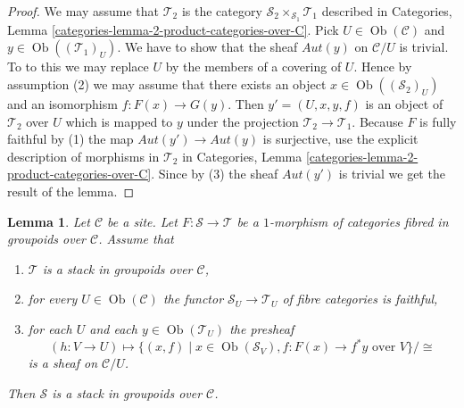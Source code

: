 \documentclass{stacks-project}
\theoremstyle{plain}
\newtheorem{lemma}[subsection]{Lemma}
\theoremstyle{definition}
\theoremstyle{remark}
\numberwithin{equation}{subsection}
\def\Ob{\mathop{\mathrm{Ob}}\nolimits}
\begin{document}
\begin{proof}
We may assume that $\mathcal{T}_2$ is the category
$\mathcal{S}_2 \times_{\mathcal{S}_1} \mathcal{T}_1$
described in
Categories, Lemma \ref{categories-lemma-2-product-categories-over-C}.
Pick $U \in \Ob(\mathcal{C})$ and
$y \in \Ob((\mathcal{T}_1)_U)$.
We have to show that the sheaf $\mathit{Aut}(y)$ on $\mathcal{C}/U$
is trivial. To to this we may replace $U$ by the members of
a covering of $U$. Hence by assumption (2) we may assume that
there exists an object $x \in \Ob((\mathcal{S}_2)_U)$
and an isomorphism $f : F(x) \to G(y)$.
Then $y' = (U, x, y, f)$ is an object of $\mathcal{T}_2$ over $U$
which is mapped to $y$ under the projection $\mathcal{T}_2 \to \mathcal{T}_1$.
Because $F$ is fully faithful by (1) the map
$\mathit{Aut}(y') \to \mathit{Aut}(y)$ is surjective, use the explicit
description of morphisms in $\mathcal{T}_2$ in
Categories, Lemma \ref{categories-lemma-2-product-categories-over-C}.
Since by (3) the sheaf $\mathit{Aut}(y')$ is trivial
we get the result of the lemma.
\end{proof}

\begin{lemma}
\label{lemma-relative-sheaf-over-stack-is-stack}
Let $\mathcal{C}$ be a site. Let $F : \mathcal{S} \to \mathcal{T}$
be a $1$-morphism of categories fibred in groupoids over $\mathcal{C}$.
Assume that
\begin{enumerate}
\item $\mathcal{T}$ is a stack in groupoids over $\mathcal{C}$,
\item for every $U \in \Ob(\mathcal{C})$ the functor
$\mathcal{S}_U \to \mathcal{T}_U$ of fibre categories is faithful,
\item for each $U$ and each $y \in \Ob(\mathcal{T}_U)$ the presheaf
$$
(h : V \to U)
\longmapsto
\{(x, f) \mid x \in \Ob(\mathcal{S}_V), f : F(x) \to f^*y\text{ over }V\}/\cong
$$
is a sheaf on $\mathcal{C}/U$.
\end{enumerate}
Then $\mathcal{S}$ is a stack in groupoids over $\mathcal{C}$.
\end{lemma}
\end{document}
